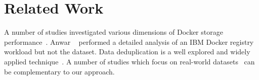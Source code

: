 \section{Related Work}
\label{sec:related}


A number of studies investigated various dimensions of Docker storage
performance~\cite{dockerssd,shifter,slacker,exoclones,docker-driver-eval,
improve-cow-container-drivers,cntr,slacker}.
%
%
%
%
Anwar \etal~\cite{dockerworkload} performed a detailed analysis
of an IBM Docker registry workload but not the dataset.
%
%
%
%
Data deduplication is a well
explored and widely applied technique~\cite{2009-sparse_indexing_inline_dedup_using_sampling-fast,
2001-low_bandwidth_network_fs-sosp,
2012-idedup-fast,
tarasov2014dmdedup,
2008-avoid_disk_bottleneck_data_domain_dedupfs-fast}.
%
A number of studies which focus on
real-world datasets~\cite{2009-dedup_effectiveness_on_vm_disk_images-systor,
2012-data_reduction_in_primary_storage-systor,
2012-hpc_practical_dedup_study-sc,
2013-charact_increment_changes_data_protect-atc,
msst16dedup-study,
2012-charact_backup_workloads-fast,
2013-charact_dedup_effic_big_data-iiswc}
 can be complementary to our approach.



